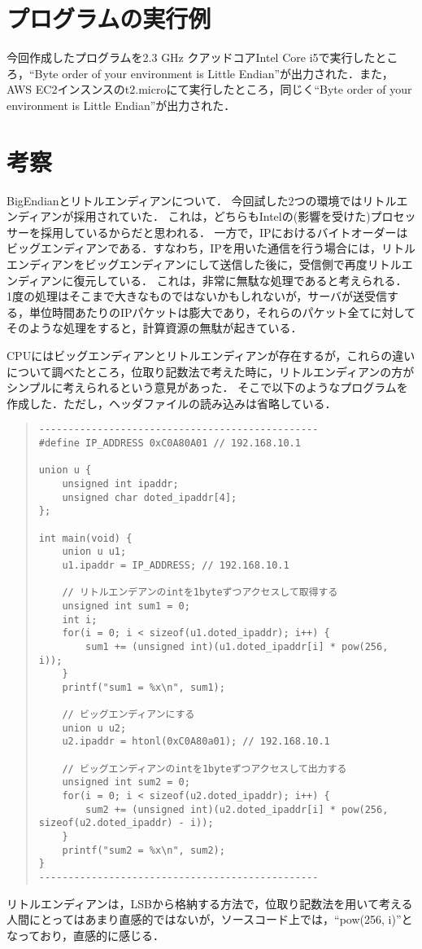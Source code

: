 \documentclass[a4paper,dvipdfmx]{jsarticle}
\begin{document}
\section{プログラムの実行例}
今回作成したプログラムを2.3 GHz クアッドコアIntel Core i5で実行したところ，``Byte order of your environment is Little Endian''が出力された．また，AWS EC2インスンスのt2.microにて実行したところ，同じく``Byte order of your environment is Little Endian''が出力された．

\section{考察}
BigEndianとリトルエンディアンについて．
今回試した2つの環境ではリトルエンディアンが採用されていた．
これは，どちらもIntelの(影響を受けた)プロセッサーを採用しているからだと思われる．
一方で，IPにおけるバイトオーダーはビッグエンディアンである．すなわち，IPを用いた通信を行う場合には，リトルエンディアンをビッグエンディアンにして送信した後に，受信側で再度リトルエンディアンに復元している．
これは，非常に無駄な処理であると考えられる．
1度の処理はそこまで大きなものではないかもしれないが，サーバが送受信する，単位時間あたりのIPパケットは膨大であり，それらのパケット全てに対してそのような処理をすると，計算資源の無駄が起きている．

CPUにはビッグエンディアンとリトルエンディアンが存在するが，これらの違いについて調べたところ，位取り記数法で考えた時に，リトルエンディアンの方がシンプルに考えられるという意見があった．
そこで以下のようなプログラムを作成した．ただし，ヘッダファイルの読み込みは省略している．

\begin{quote}
\begin{verbatim}
------------------------------------------------
#define IP_ADDRESS 0xC0A80A01 // 192.168.10.1

union u {
    unsigned int ipaddr;
    unsigned char doted_ipaddr[4];
};

int main(void) {
	union u u1; 
    u1.ipaddr = IP_ADDRESS; // 192.168.10.1

	// リトルエンデアンのintを1byteずつアクセスして取得する
    unsigned int sum1 = 0;
	int i;
    for(i = 0; i < sizeof(u1.doted_ipaddr); i++) {
        sum1 += (unsigned int)(u1.doted_ipaddr[i] * pow(256, i));
    }
    printf("sum1 = %x\n", sum1);                                   

    // ビッグエンディアンにする
    union u u2;
    u2.ipaddr = htonl(0xC0A80a01); // 192.168.10.1

    // ビッグエンディアンのintを1byteずつアクセスして出力する
    unsigned int sum2 = 0;
    for(i = 0; i < sizeof(u2.doted_ipaddr); i++) {
        sum2 += (unsigned int)(u2.doted_ipaddr[i] * pow(256, sizeof(u2.doted_ipaddr) - i));
    }
    printf("sum2 = %x\n", sum2);
}
------------------------------------------------
\end{verbatim}
\end{quote}
リトルエンディアンは，LSBから格納する方法で，位取り記数法を用いて考える人間にとってはあまり直感的ではないが，ソースコード上では，``pow(256, i)''となっており，直感的に感じる．
\end{document}
